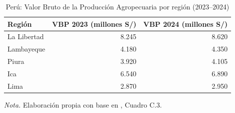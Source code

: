 \begin{table}[H]
\centering
\caption{Per\'u: Valor Bruto de la Producci\'on Agropecuaria por regi\'on (2023--2024)}
\label{tab:vbp_region}
\small
\begin{tabular}{lrr}
\toprule
\textbf{Regi\'on} & \textbf{VBP 2023 (millones S/)} & \textbf{VBP 2024 (millones S/)} \\
\midrule
La Libertad  & 8.245 & 8.620 \\
Lambayeque   & 4.180 & 4.350 \\
Piura        & 3.920 & 4.105 \\
Ica          & 6.540 & 6.890 \\
Lima         & 2.870 & 2.950 \\
\bottomrule
\end{tabular}
\parbox{0.94\textwidth}{\small \textit{Nota.} Elaboraci\'on propia con base en \citep{MIDAGRI2025}, Cuadro C.3.}
\end{table}
